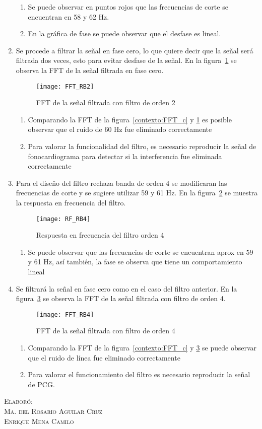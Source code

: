 \documentclass[10pt,letterpaper,spanish,twoside]{report}
\begin{document}
\begin{enumerate}
 \begin{enumerate}
 	\item Se puede observar en puntos rojos que las frecuencias de corte se encuentran en 58 y 62 Hz.
 	\item En la gráfica de fase se puede observar que el desfase es lineal.
 \end{enumerate}
 \item Se procede a filtrar la señal en fase cero, lo que quiere decir que la señal será filtrada dos veces, esto para evitar desfase de la señal. En la figura~\ref{contexto:FFT_RB2} se observa la FFT de la señal filtrada en fase cero. 
 \begin{figure}[H]
	\centering
	\texttt{[image: FFT\_RB2]}
	\caption{FFT de la señal filtrada con filtro de orden 2}
	\label{contexto:FFT_RB2}
 \end{figure} 
 \begin{enumerate}
 	\item Comparando la FFT de la figura~\ref{contexto:FFT_c} y \ref{contexto:FFT_RB2} es posible observar que el ruido de 60 Hz fue eliminado correctamente 
 	\item Para valorar la funcionalidad del filtro, es necesario reproducir la señal de fonocardiograma para detectar si la interferencia fue eliminada correctamente
 \end{enumerate}  
 \item Para el diseño del filtro rechaza banda de orden 4 se modificaran las frecuencias de corte y se sugiere utilizar 59 y 61 Hz. En la figura~\ref{contexto:RF_RB4} se muestra la respuesta en frecuencia del filtro.
 \begin{figure}[H]
 	\centering
 	\texttt{[image: RF\_RB4]}
 	\caption{Respuesta en frecuencia del filtro orden 4}
 	\label{contexto:RF_RB4}
 \end{figure}
 \begin{enumerate}
 	\item Se puede observar que las frecuencias de corte se encuentran aprox en 59 y 61 Hz, así también, la fase se observa que tiene un comportamiento lineal
 \end{enumerate}
 \item Se filtrará la señal en fase cero como en el caso del filtro anterior. En la figura~\ref{contexto:FFT_RB4} se observa la FFT de la señal filtrada con filtro de orden 4.
 \begin{figure}[H]
 	\centering 
 	\texttt{[image: FFT\_RB4]}
 	\caption{FFT de la señal filtrada con filtro de orden 4}
 	\label{contexto:FFT_RB4}
 \end{figure}
 \begin{enumerate}
 	\item Comparando la FFT de la figura~\ref{contexto:FFT_c} y \ref{contexto:FFT_RB4} se puede observar que el ruido de línea fue eliminado correctamente
 	\item Para valorar el funcionamiento del filtro es necesario reproducir la señal de PCG.
 \end{enumerate}
\end{enumerate}


\vfill
\begin{flushright}
\textsc{Elaboró:\\
Ma. del Rosario Aguilar Cruz\\
Enrique Mena Camilo}
\end{flushright}
\end{document}
